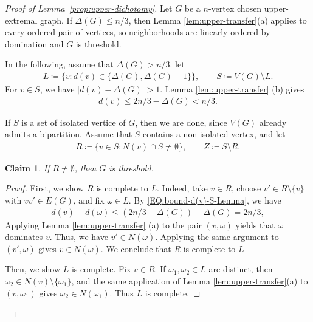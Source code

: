\documentclass[10pt,a4paper]{article}
\newtheorem{claim}[definition]{Claim}
\begin{document}
\begin{proof}[Proof of Lemma~\ref{prop:upper-dichotomy}]
Let $G$ be a $n$-vertex chosen upper-extremal graph. If $\Delta(G)\le n/3$, then Lemma \ref{lem:upper-transfer}(a) applies to every ordered pair of vertices, so neighborhoods are linearly ordered by domination and $G$ is threshold.
    
In the following, assume that $\Delta(G)>n/3$.  let 
    \begin{align*}
      L\coloneqq\{v:d(v)\in\{\Delta(G),\Delta(G)-1\}\},\qquad S\coloneqq V(G)\setminus L.
    \end{align*}
For  $v\in S$, we have $|d(v)-\Delta(G)|>1$.   Lemma \ref{lem:upper-transfer} (b) gives
    \begin{align}\label{EQ:bound-d(v)-S-Lemma}
d(v)\le 2n/3-\Delta(G)<n/3.
    \end{align}


If $S$ is a  set of isolated vertice of $G$, then we are done, since $V(G)$ already admits a bipartition. Assume that $S$ contains a non-isolated vertex,
    and let
    \begin{align*}
      R\coloneqq\{v\in S:N(v)\cap S\ne\emptyset\},\qquad Z\coloneqq S\setminus R.
    \end{align*}
    



\begin{claim}\label{claim-G-threshold-R-nonemptyset}
If $R\ne\emptyset$, then $G$ is threshold. 
\end{claim}
\begin{proof}


First, we show $R$ is complete to $L$.  Indeed, take $v\in R$, choose $v'\in R\setminus\{v\}$ with $vv'\in E(G)$, and fix $\omega\in L$.  By \eqref{EQ:bound-d(v)-S-Lemma}, we have
    \begin{align*}
      d(v)+d(\omega)\le (2n/3-\Delta(G))+\Delta(G)=2n/3,
    \end{align*}
Applying Lemma \ref{lem:upper-transfer} (a)  to the pair $(v,\omega)$ yields that $\omega$ dominates $v$.  Thus, we have  $v'\in N(\omega)$.  Applying the same argument to $(v',\omega)$ gives $v\in N(\omega)$.  We conclude that $R$ is complete to $L$




 Then, we show $L$ is complete. Fix $v\in R$.  If $\omega_1,\omega_2\in L$ are distinct, then $\omega_2\in N(v)\setminus\{\omega_1\}$, and the same application of Lemma \ref{lem:upper-transfer}(a) to $(v,\omega_1)$ gives $\omega_2\in N(\omega_1)$.  Thus $L$ is complete.





\end{proof}
\end{proof}
\end{document}
